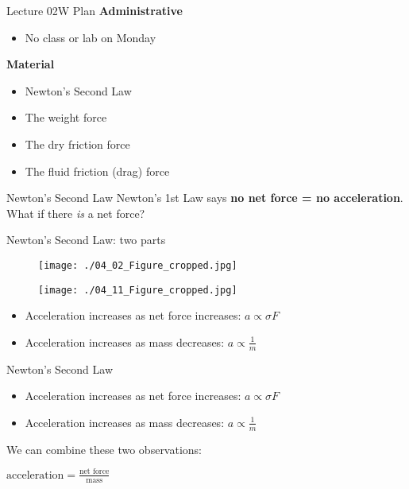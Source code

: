 \documentclass[english]{beamer}
\begin{document}
\begin{frame}{Lecture 02W Plan}
  \textbf{Administrative}
  \begin{itemize}
    \item No class or lab on Monday
  \end{itemize}
  \textbf{Material}
  \begin{itemize}
    \item Newton's Second Law
    \item The weight force
    \item The dry friction force
    \item The fluid friction (drag) force
  \end{itemize}
\end{frame}

\begin{frame}{Newton's Second Law}
  Newton's 1st Law says \textbf{no net force = no acceleration}. What if there \emph{is} a net force?
\end{frame}

\begin{frame}{Newton's Second Law: two parts}
  \begin{figure}[!tbp]
    \begin{minipage}[b]{0.4\textwidth}
      \texttt{[image: ./04\_02\_Figure\_cropped.jpg]}
    \end{minipage}
    \begin{minipage}[b]{0.4\textwidth}
      \texttt{[image: ./04\_11\_Figure\_cropped.jpg]}
    \end{minipage}
  \end{figure}
  \begin{itemize}
    \item Acceleration increases as net force increases: $a \propto \sigma F$
    \item Acceleration increases as mass decreases: $a \propto \frac{1}{m}$
  \end{itemize}
\end{frame}

\begin{frame}{Newton's Second Law}
  \begin{itemize}
    \item Acceleration increases as net force increases: $a \propto \sigma F$
    \item Acceleration increases as mass decreases: $a \propto \frac{1}{m}$
  \end{itemize}
  We can combine these two observations:
  \begin{center}
    $\text{acceleration} = \frac{\text{net force}}{\text{mass}}$\\
  \end{center}
\end{frame}
\end{document}

